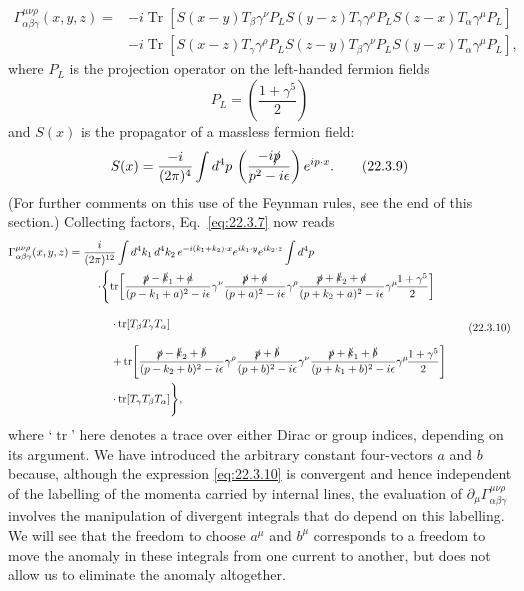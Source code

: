 \begin{equation}
 \begin{aligned}
 \Gamma_{\alpha\beta\gamma}^{\mu\nu\rho}(x,y,z)
 ={}&-i\operatorname{Tr}\!\left[
  S(x-y)T_\beta\gamma^\nu P_L
  S(y-z)T_\gamma\gamma^\rho P_L
  S(z-x)T_\alpha\gamma^\mu P_L
 \right]
 \\
 &-i\operatorname{Tr}\!\left[
  S(x-z)T_\gamma\gamma^\rho P_L
  S(z-y)T_\beta\gamma^\nu P_L
  S(y-x)T_\alpha\gamma^\mu P_L
 \right],
 \end{aligned}
 \tag{22.3.7}\label{eq:22.3.7}
\end{equation}
where $P_L$ is the projection operator on the left-handed fermion fields
\begin{equation}
 P_L=\left(\frac{1+\gamma^5}{2}\right)
 \tag{22.3.8}\label{eq:22.3.8}
\end{equation}
and $S(x)$ is the propagator of a massless fermion field:
\begin{equation}
 S(x)=\frac{-i}{(2\pi)^4}\int d^4p\,
 \left(\frac{-i\sl{p}}{p^2-i\epsilon}\right)e^{ip\cdot x}.
 \tag{22.3.9}\label{eq:22.3.9}
\end{equation}
(For further comments on this use of the Feynman rules, see the end of this
section.) Collecting factors, Eq.~\eqref{eq:22.3.7} now reads
\begin{equation}
 \begin{aligned}
 \Gamma_{\alpha\beta\gamma}^{\mu\nu\rho}(x,y,z)
 ={}&\frac{i}{(2\pi)^{12}}
 \int d^4k_1\,d^4k_2\,
 e^{-i(k_1+k_2)\cdot x}e^{ik_1\cdot y}e^{ik_2\cdot z}
 \int d^4p
 \\
 &\mathrel{\phantom{=}}\cdot
 \Biggl\{
 \operatorname{tr}\!\left[
  \frac{\sl{p}-\sl{k}_1+\sl{a}}{(p-k_1+a)^2-i\epsilon}\gamma^\nu
  \frac{\sl{p}+\sl{a}}{(p+a)^2-i\epsilon}\gamma^\rho
  \frac{\sl{p}+\sl{k}_2+\sl{a}}{(p+k_2+a)^2-i\epsilon}\gamma^\mu
  \!\frac{1+\gamma^5}{2}
 \right]
 \\
 &\mathrel{\phantom{=\cdot\Biggl\{}}\cdot
 \operatorname{tr}[T_\beta T_\gamma T_\alpha]
 \\
 &\mathrel{\phantom{=\cdot\Biggl\{}}+
 \operatorname{tr}\!\left[
  \frac{\sl{p}-\sl{k}_2+\sl{b}}{(p-k_2+b)^2-i\epsilon}\gamma^\rho
  \frac{\sl{p}+\sl{b}}{(p+b)^2-i\epsilon}\gamma^\nu
  \frac{\sl{p}+\sl{k}_1+\sl{b}}{(p+k_1+b)^2-i\epsilon}\gamma^\mu
  \!\frac{1+\gamma^5}{2}
 \right]
 \\
 &\mathrel{\phantom{=\cdot\Biggl\{}}\cdot
 \operatorname{tr}[T_\gamma T_\beta T_\alpha]
 \Biggr\},
 \end{aligned}
 \tag{22.3.10}\label{eq:22.3.10}
\end{equation}
where `$\operatorname{tr}$' here denotes a trace over either Dirac or group
indices, depending on its argument. We have introduced the arbitrary
constant four-vectors $a$ and $b$ because, although the expression
\eqref{eq:22.3.10} is convergent and hence independent of the labelling of
the momenta carried by internal lines, the evaluation of
$\partial_\mu\Gamma_{\alpha\beta\gamma}^{\mu\nu\rho}$ involves the
manipulation of divergent integrals that do depend on this labelling. We
will see that the freedom to choose $a^\mu$ and $b^\mu$ corresponds to a
freedom to move the anomaly in these integrals from one current to another,
but does not allow us to eliminate the anomaly altogether.

